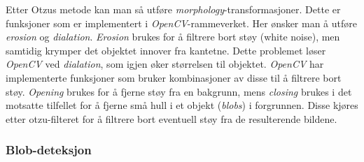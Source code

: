 Etter Otzus metode kan man så utføre \textit{morphology}-transformasjoner. 
Dette er funksjoner som er implementert i \textit{OpenCV}-rammeverket. 
Her ønsker man å utføre \textit{erosion} og \textit{dialation}.
\textit{Erosion} brukes for å filtrere bort støy (white noise), men samtidig krymper det objektet innover fra kantetne. Dette problemet løser \textit{OpenCV} ved \textit{dialation}, som igjen øker størrelsen til objektet.
\textit{OpenCV} har implementerte funksjoner som bruker kombinasjoner av disse til å filtrere bort støy. 
\textit{Opening} brukes for å fjerne støy fra en bakgrunn, mens \textit{closing} brukes i det motsatte tilfellet for å fjerne små hull i et objekt (\textit{blobs}) i forgrunnen. Disse kjøres etter otzu-filteret for å filtrere bort eventuell støy fra de resulterende bildene.


\subsubsection{Blob-deteksjon}\label{sec:impl:programvare:blob-detection}

